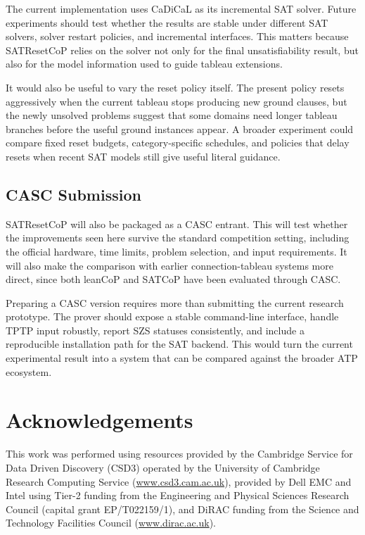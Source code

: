 \documentclass{EasyChair3.5/easychair}
\newcommand{\cop}[1]{\textsf{#1}}
\begin{document}
The current implementation uses \cop{CaDiCaL} as its incremental SAT solver.
Future experiments should test whether the results are stable under different SAT solvers, solver restart policies, and incremental interfaces.
This matters because \cop{SATResetCoP} relies on the solver not only for the final unsatisfiability result, but also for the model information used to guide tableau extensions.

It would also be useful to vary the reset policy itself.
The present policy resets aggressively when the current tableau stops producing new ground clauses, but the newly unsolved problems suggest that some domains need longer tableau branches before the useful ground instances appear.
A broader experiment could compare fixed reset budgets, category-specific schedules, and policies that delay resets when recent SAT models still give useful literal guidance.

\subsection{CASC Submission}

\cop{SATResetCoP} will also be packaged as a CASC entrant.
This will test whether the improvements seen here survive the standard competition setting, including the official hardware, time limits, problem selection, and input requirements.
It will also make the comparison with earlier connection-tableau systems more direct, since both \cop{leanCoP} and \cop{SATCoP} have been evaluated through CASC.

Preparing a CASC version requires more than submitting the current research prototype.
The prover should expose a stable command-line interface, handle TPTP input robustly, report SZS statuses consistently, and include a reproducible installation path for the SAT backend.
This would turn the current experimental result into a system that can be compared against the broader ATP ecosystem.

\section{Acknowledgements}

This work was performed using resources provided by the Cambridge Service for Data Driven Discovery (CSD3) operated by the University of Cambridge Research Computing Service (\url{www.csd3.cam.ac.uk}), provided by Dell EMC and Intel using Tier-2 funding from the Engineering and Physical Sciences Research Council (capital grant EP/T022159/1), and DiRAC funding from the Science and Technology Facilities Council (\url{www.dirac.ac.uk}).


\end{document}

